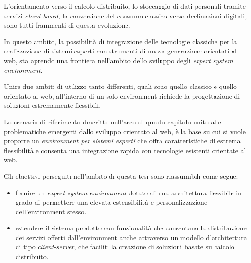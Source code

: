 L'orientamento verso il calcolo distribuito, lo stoccaggio di dati personali tramite servizi \emph{cloud-based}, la conversione del consumo classico verso declinazioni digitali, sono tutti frammenti di questa evoluzione.

In questo ambito, la possibilità di integrazione delle tecnologie classiche per la realizzazione di sistemi esperti con strumenti di nuova generazione orientati al web, sta aprendo una frontiera nell'ambito dello sviluppo degli \emph{expert system environment}.

Unire due ambiti di utilizzo tanto differenti, quali sono quello classico e quello orientato al web, all'interno di un solo environment richiede la progettazione di soluzioni estremamente flessibili.

Lo scenario di riferimento descritto nell'arco di questo capitolo unito alle problematiche emergenti dallo sviluppo orientato al web, è la base su cui si vuole proporre un \emph{environment per sistemi esperti} che offra caratteristiche di estrema flessibilità e consenta una integrazione rapida con tecnologie esistenti orientate al web.

Gli obiettivi perseguiti nell'ambito di questa tesi sono riassumibili come segue:
\begin{itemize}
	\item fornire un \emph{expert system environment} dotato di una architettura flessibile in grado di permettere una elevata estensibilità e personalizzazione dell'environment stesso.
	\item estendere il sistema prodotto con funzionalità che consentano la distribuzione dei servizi offerti dall'environment anche attraverso un modello d'architettura di tipo \emph{client-server}, che faciliti la creazione di soluzioni basate su calcolo distribuito.
\end{itemize}


